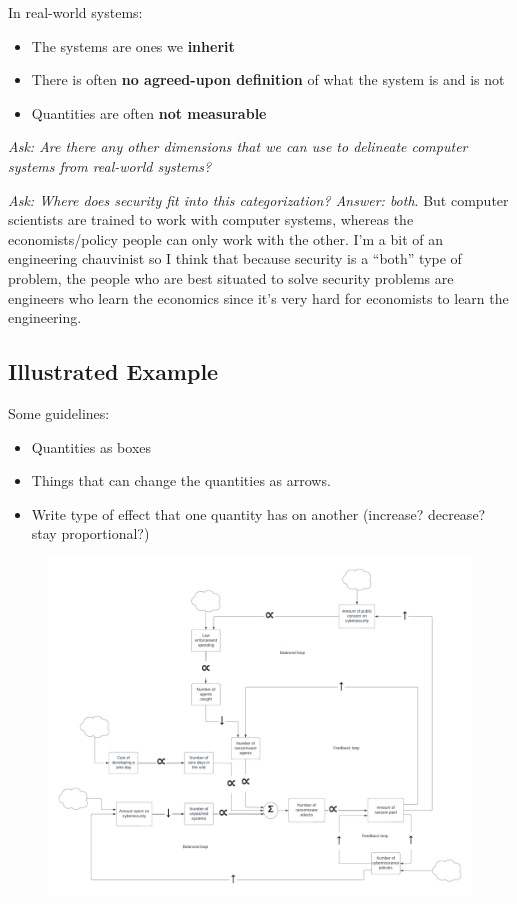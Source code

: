 \documentclass[11pt]{article}
\begin{document}
In real-world systems:
\begin{itemize}
    \item The systems are ones we {\bf inherit}
    \item There is often {\bf no agreed-upon definition} of what the system is and is not
    \item Quantities are often {\bf not measurable}
\end{itemize}

{\it Ask: Are there any other dimensions that we can use to delineate computer systems from real-world systems?}

{\it Ask: Where does security fit into this categorization? Answer: both}. But computer scientists are trained to work with computer systems, whereas the economists/policy people can only work with the other. I'm a bit of an engineering chauvinist so I think that because security is a ``both'' type of problem, the people who are best situated to solve security problems are engineers who learn the economics since it's very hard for economists to learn the engineering.

\subsection{Illustrated Example}
Some guidelines:
\begin{itemize}
    \item Quantities as boxes
    \item Things that can change the quantities as arrows.
    \item Write type of effect that one quantity has on another (increase? decrease? stay proportional?)
\end{itemize}

\begin{figure}[h]
    \includegraphics*[width=\textwidth]{ransomware-sys-diagram.pdf}
\end{figure}
\end{document}
